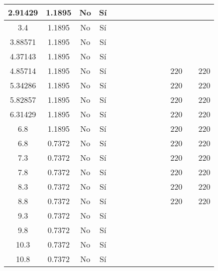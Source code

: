 \begin{table}[H]
{\begin{tabular}{|c|c|c|c|c|c|c|c|c|c|c|c|c|c|}
\hline
2.91429 & 1.1895 & No  & Sí  &     &     &     &     &     &     &     &     &     &  \bigstrut\\
\hline
3.4 & 1.1895 & No  & Sí  &     &     &     &     &     &     &     &     &     &  \bigstrut\\
\hline
3.88571 & 1.1895 & No  & Sí  &     &     &     &     &     &     &     &     &     &  \bigstrut\\
\hline
4.37143 & 1.1895 & No  & Sí  &     &     &     &     &     &     &     &     &     &  \bigstrut\\
\hline
4.85714 & 1.1895 & No  & Sí  &     &     &     &     &     &     &     & 220 &     & 220 \bigstrut\\
\hline
5.34286 & 1.1895 & No  & Sí  &     &     &     &     &     &     &     & 220 &     & 220 \bigstrut\\
\hline
5.82857 & 1.1895 & No  & Sí  &     &     &     &     &     &     &     & 220 &     & 220 \bigstrut\\
\hline
6.31429 & 1.1895 & No  & Sí  &     &     &     &     &     &     &     & 220 &     & 220 \bigstrut\\
\hline
6.8 & 1.1895 & No  & Sí  &     &     &     &     &     &     &     & 220 &     & 220 \bigstrut\\
\hline
6.8 & 0.7372 & No  & Sí  &     &     &     &     &     &     &     & 220 &     & 220 \bigstrut\\
\hline
7.3 & 0.7372 & No  & Sí  &     &     &     &     &     &     &     & 220 &     & 220 \bigstrut\\
\hline
7.8 & 0.7372 & No  & Sí  &     &     &     &     &     &     &     & 220 &     & 220 \bigstrut\\
\hline
8.3 & 0.7372 & No  & Sí  &     &     &     &     &     &     &     & 220 &     & 220 \bigstrut\\
\hline
8.8 & 0.7372 & No  & Sí  &     &     &     &     &     &     &     & 220 &     & 220 \bigstrut\\
\hline
9.3 & 0.7372 & No  & Sí  &     &     &     &     &     &     &     &     &     &  \bigstrut\\
\hline
9.8 & 0.7372 & No  & Sí  &     &     &     &     &     &     &     &     &     &  \bigstrut\\
\hline
10.3 & 0.7372 & No  & Sí  &     &     &     &     &     &     &     &     &     &  \bigstrut\\
\hline
10.8 & 0.7372 & No  & Sí  &     &     &     &     &     &     &     &     &     &  \bigstrut\\
\hline

\end{tabular}}
\end{table}
